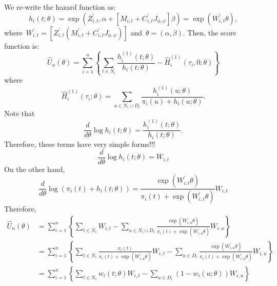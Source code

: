 \documentclass[11pt]{amsart}
\begin{document}
We re-write the hazard function as:
\[
h_i (t; \theta) = \exp \left( Z_{i,t}^\prime, \alpha + [M_{i,t} + C_{i,t}^\prime
  J_{\phi, \psi} ] \beta \right) = \exp \left( W_{i,t}^\prime \theta \right),
\]
where~$W_{i,t}^\prime = [ Z_{i,t}^\prime (M_{i,t}^\prime +
C_{i,t}^\prime J_{\phi, \psi}) ]$ and~$\theta = (\alpha,
\beta)$. Then, the score function is:
\[
\hat U_n (\theta) = \sum_{i=1}^n \left \{  \sum_{t \in N_i}
  \frac{h_i^{(1)} (t; \theta)}{h_i (t; \theta)} - \hat H_i^{(1)}
  (\tau_i, 0; \theta) 
\right \}
\]
where
\[
\hat H_i^{(1)} (\tau_i; \theta) = \sum_{u \in N_i \cup D_i} \frac{
  h^{(1)}_i (u; \theta)}{\pi_i (u) + h_i (u; \theta)}.
\]
Note that
\[
\frac{d}{d\theta} \log h_i (t; \theta) = \frac{h^{(1)}_i (t;
  \theta)}{h_i (t; \theta)}.
\]
Therefore, these terms have very simple forms!!! 
\[
\frac{d}{d\theta} \log h_i (t; \theta) = W_{i,t}
\]
On the other hand,
\[
\frac{d}{d \theta} \log \left( \pi_i (t) + h_i (t;\theta) \right) = 
\frac{\exp \left( W_{i,t}^\prime \theta \right)}{\pi_i (t) + \exp
  \left( W_{i,t}^\prime \theta \right)} W_{i,t}
\]
Therefore,
\begin{align*}
\hat U_n (\theta) 
  &= \sum_{i=1}^n \left \{ \sum_{t \in N_i} W_{i,t} -
    \sum_{u \in N_i \cup D_i} \frac{\exp \left( W_{i,u}^\prime \theta
    \right)}{\pi_i (t) + \exp \left( W_{i,u}^\prime \theta \right)}
    W_{i,u} \right \} \\
  &= \sum_{i=1}^n \left \{ \sum_{t \in N_i} \frac{\pi_i (t)}{\pi_i (t)
    + \exp \left( W_{i,u}^\prime \theta \right)} W_{i,t} -
    \sum_{u \in D_i} \frac{\exp \left( W_{i,u}^\prime \theta
    \right)}{\pi_i (t) + \exp \left( W_{i,u}^\prime \theta \right)}
    W_{i,u} \right \} \\
  &= \sum_{i=1}^n \left \{ \sum_{t \in N_i} w_{i} (t; \theta) W_{i,t} -
    \sum_{u \in D_i} (1 - w_i (u; \theta)) W_{i,u} \right \} \\
\end{align*}
\end{document}
